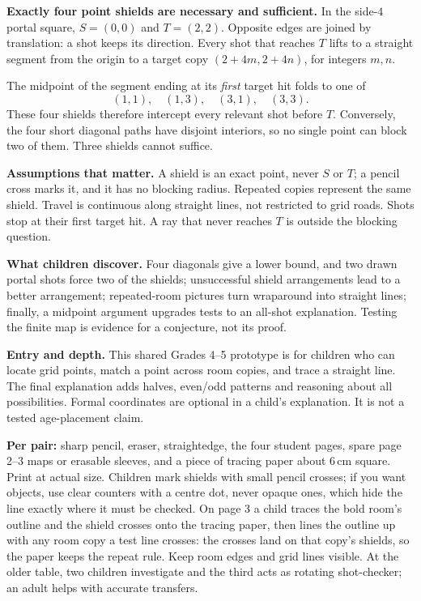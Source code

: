 \documentclass[11pt,letterpaper]{article}
\newcommand{\sectiontitle}[1]{\par\vspace{4pt}{\large\bfseries #1}\par}
\begin{document}
\sectiontitle{The mathematics first}
\textbf{Exactly four point shields are necessary and sufficient.} In the side-$4$ portal square, $S=(0,0)$ and $T=(2,2)$. Opposite edges are joined by translation: a shot keeps its direction. Every shot that reaches $T$ lifts to a straight segment from the origin to a target copy $(2+4m,2+4n)$, for integers $m,n$.

The midpoint of the segment ending at its \emph{first} target hit folds to one of
\[
(1,1),\quad(1,3),\quad(3,1),\quad(3,3).
\]
These four shields therefore intercept every relevant shot before $T$. Conversely, the four short diagonal paths have disjoint interiors, so no single point can block two of them. Three shields cannot suffice.

\textbf{Assumptions that matter.} A shield is an exact point, never $S$ or $T$; a pencil cross marks it, and it has no blocking radius. Repeated copies represent the same shield. Travel is continuous along straight lines, not restricted to grid roads. Shots stop at their first target hit. A ray that never reaches $T$ is outside the blocking question.

\textbf{What children discover.} Four diagonals give a lower bound, and two drawn portal shots force two of the shields; unsuccessful shield arrangements lead to a better arrangement; repeated-room pictures turn wraparound into straight lines; finally, a midpoint argument upgrades tests to an all-shot explanation. Testing the finite map is evidence for a conjecture, not its proof.

\textbf{Entry and depth.} This shared Grades 4--5 prototype is for children who can locate grid points, match a point across room copies, and trace a straight line. The final explanation adds halves, even/odd patterns and reasoning about all possibilities. Formal coordinates are optional in a child's explanation. It is not a tested age-placement claim.

\sectiontitle{Set up, launch, and a first route}
\textbf{Per pair:} sharp pencil, eraser, straightedge, the four student pages, spare page 2--3 maps or erasable sleeves, and a piece of tracing paper about 6\,cm square. Print at actual size. Children mark shields with small pencil crosses; if you want objects, use clear counters with a centre dot, never opaque ones, which hide the line exactly where it must be checked. On page 3 a child traces the bold room's outline and the shield crosses onto the tracing paper, then lines the outline up with any room copy a test line crosses: the crosses land on that copy's shields, so the paper keeps the repeat rule. Keep room edges and grid lines visible. At the older table, two children investigate and the third acts as rotating shot-checker; an adult helps with accurate transfers.
\end{document}
